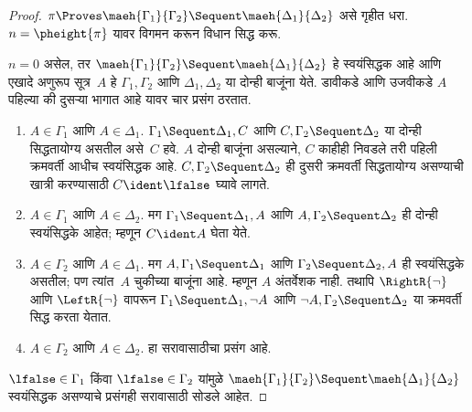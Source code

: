 \begin{proof}
  $\pi \Proves \maeh{\Gamma_1}{\Gamma_2} \Sequent
  \maeh{\Delta_1}{\Delta_2}$ असे गृहीत धरा.
  $n=\pheight{\pi}$ यावर विगमन करून विधान सिद्ध करू.

  $n=0$ असेल, तर
  $\maeh{\Gamma_1}{\Gamma_2} \Sequent
  \maeh{\Delta_1}{\Delta_2}$ हे स्वयंसिद्धक आहे
  आणि एखादे अणुरूप सूत्र~$A$
  हे $\Gamma_1, \Gamma_2$ आणि
  $\Delta_1, \Delta_2$ या दोन्ही बाजूंना येते.
  डावीकडे आणि उजवीकडे $A$ पहिल्या की
  दुसऱ्या भागात आहे यावर चार प्रसंग ठरतात.
  \begin{enumerate}
    \item $A \in \Gamma_1$ आणि $A \in \Delta_1$.
    $\Gamma_1 \Sequent \Delta_1, C$ आणि
    $C, \Gamma_2 \Sequent \Delta_2$ या दोन्ही
    सिद्धतायोग्य असतील असे~$C$ हवे.
    $A$ दोन्ही बाजूंना असल्याने, $C$ काहीही
    निवडले तरी पहिली क्रमवर्ती आधीच स्वयंसिद्धक आहे.
    $C, \Gamma_2 \Sequent \Delta_2$ ही दुसरी
    क्रमवर्ती सिद्धतायोग्य असण्याची खात्री
    करण्यासाठी $C \ident \lfalse$ घ्यावे लागते.
    \item $A \in \Gamma_1$ आणि $A \in \Delta_2$.
    मग $\Gamma_1 \Sequent \Delta_1, A$ आणि
    $A, \Gamma_2 \Sequent \Delta_2$ ही दोन्ही
    स्वयंसिद्धके आहेत; म्हणून $C \ident A$ घेता येते.
    \item $A \in \Gamma_2$ आणि $A \in \Delta_1$.
    मग $A, \Gamma_1 \Sequent \Delta_1$ आणि
    $\Gamma_2 \Sequent \Delta_2, A$ ही स्वयंसिद्धके
    असतील; पण त्यांत~$A$ चुकीच्या बाजूंना आहे.
    म्हणून $A$ अंतर्वेशक नाही.
    तथापि $\RightR{\lnot}$ आणि $\LeftR{\lnot}$
    वापरून $\Gamma_1
    \Sequent \Delta_1, \lnot A$ आणि
    $\lnot A, \Gamma_2 \Sequent
    \Delta_2$ या क्रमवर्ती सिद्ध करता येतात.
    \item $A \in \Gamma_2$ आणि $A \in \Delta_2$.
    हा सरावासाठीचा प्रसंग आहे.
  \end{enumerate}
  $\lfalse \in \Gamma_1$ किंवा
  $\lfalse \in \Gamma_2$ यांमुळे
  $\maeh{\Gamma_1}{\Gamma_2} \Sequent
  \maeh{\Delta_1}{\Delta_2}$ स्वयंसिद्धक असण्याचे
  प्रसंगही सरावासाठी सोडले आहेत.


\end{proof}
